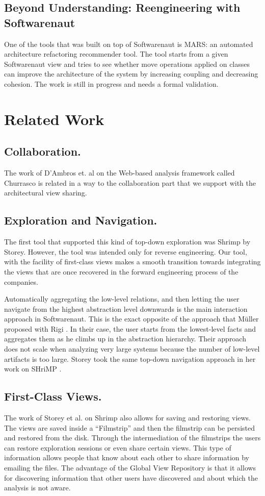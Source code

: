 \documentclass[preprint,12pt]{elsarticle}
\begin{document}
\subsection {Beyond Understanding: Reengineering with Softwarenaut}
One of the tools that was built on top of Softwarenaut is MARS: an automated architecture refactoring recommender tool. The tool starts from a given Softwarenaut view and tries to see whether move operations applied on classes can improve the architecture of the system by increasing coupling and decreasing cohesion. The work is still in progress and needs a formal validation. 


\section {Related Work}
\label {sec:rel}
\subsection {Collaboration.} The work of D’Ambros et. al on the Web-based analysis framework called Churrasco is related in a way to the collaboration part that we support with the architectural view sharing. 

\subsection {Exploration and Navigation.} The first tool that supported this kind of top-down exploration was Shrimp by Storey. However, the tool was intended only for reverse engineering. Our tool, with the facility of first-class views makes a smooth transition towards integrating the views that are once recovered in the forward engineering process of the companies.

Automatically aggregating the low-level relations, and then letting the user navigate from the highest abstraction level downwards is the main interaction approach in Softwarenaut. This is the exact opposite of the approach that M{\"u}ller proposed with Rigi \cite{muller-revengenv}. In their case, the user starts from the lowest-level facts and aggregates them as he climbs up in the abstraction hierarchy. Their approach does not scale when analyzing very large systems because the number of low-level artifacts is too large. Storey took the same top-down navigation approach in her work on SHriMP \cite{storey-shrimp}.

\subsection {First-Class Views.} The work of Storey et al. on Shrimp also allows for saving and restoring views. The views are saved inside a “Filmstrip” and then the filmstrip can be persisted and restored from the disk. Through the intermediation of the filmstrips the users can restore exploration sessions or even share certain views. This type of information allows people that know about each other to share information by emailing the files. The advantage of the Global View Repository is that it allows for discovering information that other users have discovered and about which the analysis is not aware. 
\end{document}
